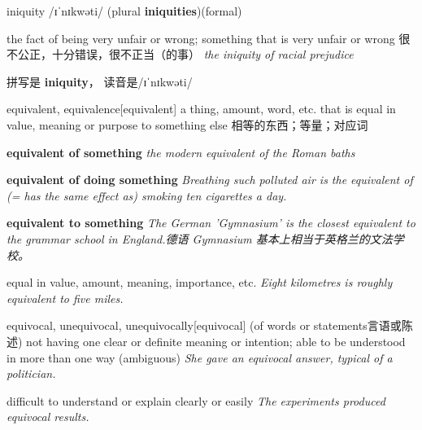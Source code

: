 \begin{DefWord}{iniquity}
    /ɪˈnɪkwəti/ (plural \textbf{iniquities})(formal)

the fact of being very unfair or wrong; something that is very unfair or wrong 很不公正，十分错误，很不正当（的事）
\textit{the iniquity of racial prejudice}

    \begin{remark}
        拼写是 \textbf{iniquity}， 读音是/ɪˈnɪkwəti/
    \end{remark}
\end{DefWord}

\begin{DefWord}{equivalent, equivalence}[equivalent]
    a thing, amount, word, etc. that is equal in value, meaning or purpose to something else 相等的东西；等量；对应词

    \textbf{equivalent of something} \textit{the modern equivalent of the Roman baths}

    \textbf{equivalent of doing something} \textit{Breathing such polluted air is the equivalent of (= has the same effect as) smoking ten cigarettes a day.}

    \textbf{equivalent to something} \textit{The German 'Gymnasium' is the closest equivalent to the grammar school in England.德语 Gymnasium 基本上相当于英格兰的文法学校。}

    equal in value, amount, meaning, importance, etc.
    \textit{Eight kilometres is roughly equivalent to five miles.}
\end{DefWord}

\begin{DefWord}{equivocal, unequivocal, unequivocally}[equivocal]
    (of words or statements言语或陈述) not having one clear or definite meaning or intention; able to be understood in more than one way (ambiguous)
    \textit{She gave an equivocal answer, typical of a politician.}

    difficult to understand or explain clearly or easily
    \textit{The experiments produced equivocal results.}
\end{DefWord}